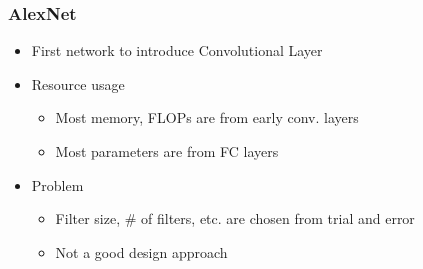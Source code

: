 \subsubsection*{AlexNet}
\begin{itemize}
    \item First network to introduce Convolutional Layer
    \item Resource usage
    \begin{itemize}
        \item Most memory, FLOPs are from early conv. layers
        \item Most parameters are from FC layers
    \end{itemize}
    \item Problem
    \begin{itemize}
        \item Filter size, \# of filters, etc. are chosen from trial and error
        \item Not a good design approach
    \end{itemize}
\end{itemize}
\begin{figures}
\end{figures}

